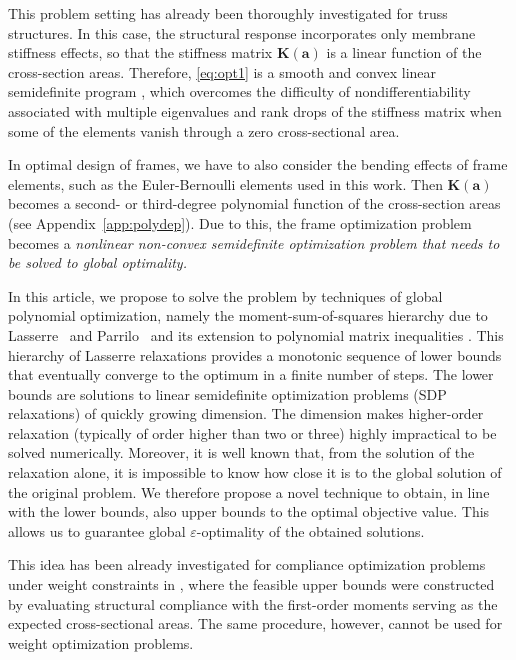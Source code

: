 \documentclass[final,onefignum,onetabnum]{siamart220329}
\begin{document}
This problem setting has already been thoroughly investigated for truss structures. In this case, the structural response incorporates only membrane stiffness effects, so that the stiffness matrix $\mathbf{K}(\mathbf{a})$ is a linear function of the cross-section areas. Therefore, \eqref{eq:opt1} is a {smooth and} convex linear semidefinite program \cite{Achtziger2007,Achtziger2008}, which overcomes the difficulty of nondifferentiability associated with multiple eigenvalues and rank drops of the stiffness matrix when some of the elements vanish through a zero cross-sectional area.

In optimal design of frames, we have to also consider the bending effects of frame elements, such as the Euler-Bernoulli elements used in this work. Then $\mathbf{K}(\mathbf{a})$ becomes a second- or third-degree polynomial function of the cross-section areas {(see Appendix~\ref{app:polydep})}. Due to this, the frame optimization problem becomes a {\it nonlinear non-convex semidefinite optimization problem that needs to be solved to global optimality.}

In this article, we propose to solve the problem by techniques of global polynomial optimization, namely the moment-sum-of-squares hierarchy due to Lasserre~\cite{Lasserre2001} and Parrilo~\cite{Parrilo2003} and its extension to polynomial matrix inequalities \cite{Henrion2006}. This hierarchy of Lasserre relaxations provides a monotonic sequence of lower bounds that eventually converge to the optimum in a finite number of steps. The lower bounds are solutions to linear semidefinite optimization problems (SDP relaxations) of quickly growing dimension. The dimension makes higher-order relaxation (typically of order higher than two or three) highly impractical to be solved numerically. Moreover, it is well known that, from the solution of the relaxation alone, it is impossible to know how close it is to the global solution of the original problem. We therefore propose a novel technique to obtain, in line with the lower bounds, also upper bounds to the optimal objective value. This allows us to guarantee global $\varepsilon$-optimality of the obtained solutions.

{This idea has been already investigated for compliance optimization problems under weight constraints in \cite{Tyburec2021}, where the feasible upper bounds were constructed by evaluating structural compliance with the first-order moments serving as the expected cross-sectional areas. The same procedure, however, cannot be used for weight optimization problems.}
\end{document}
